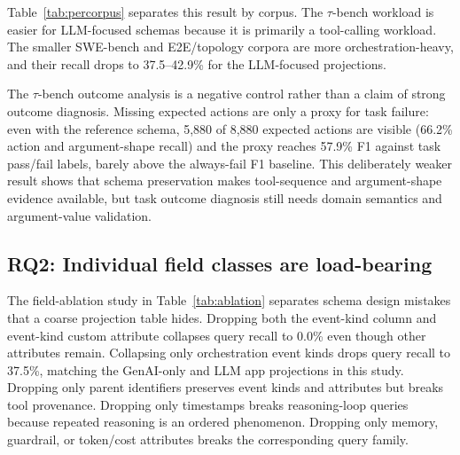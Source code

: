 \documentclass[conference]{IEEEtran}
\begin{document}
\begin{table}[t]
\centering
\scriptsize
\caption{Per-domain/model $\tau$-bench failure-proxy validation for the
reference schema. The final column is TP/FP/FN/TN.}
\label{tab:taugroups}
\end{table}

Table~\ref{tab:percorpus} separates this result by corpus. The
$\tau$-bench workload is easier for LLM-focused schemas because it is
primarily a tool-calling workload. The smaller SWE-bench and
E2E/topology corpora are more orchestration-heavy, and their recall
drops to 37.5--42.9\% for the LLM-focused projections.

The $\tau$-bench outcome analysis is a negative control rather than a
claim of strong outcome diagnosis. Missing expected actions are only a
proxy for task failure: even with the reference schema, 5,880 of 8,880
expected actions are visible (66.2\% action and argument-shape recall)
and the proxy reaches 57.9\% F1 against task pass/fail labels, barely
above the always-fail F1 baseline. This deliberately weaker result shows
that schema preservation makes tool-sequence and argument-shape evidence
available, but task outcome diagnosis still needs domain semantics and
argument-value validation.

\subsection{\textbf{RQ2}: Individual field classes are load-bearing}

The field-ablation study in Table~\ref{tab:ablation} separates schema
design mistakes that a coarse projection table hides. Dropping both the
event-kind column and event-kind custom attribute collapses query recall
to 0.0\% even though other attributes remain. Collapsing only
orchestration event kinds drops query recall to 37.5\%, matching the
GenAI-only and LLM app projections in this study. Dropping only parent
identifiers preserves event kinds and attributes but breaks tool
provenance. Dropping only timestamps breaks reasoning-loop queries
because repeated reasoning is an ordered phenomenon. Dropping only
memory, guardrail, or token/cost attributes breaks the corresponding
query family.
\end{document}

